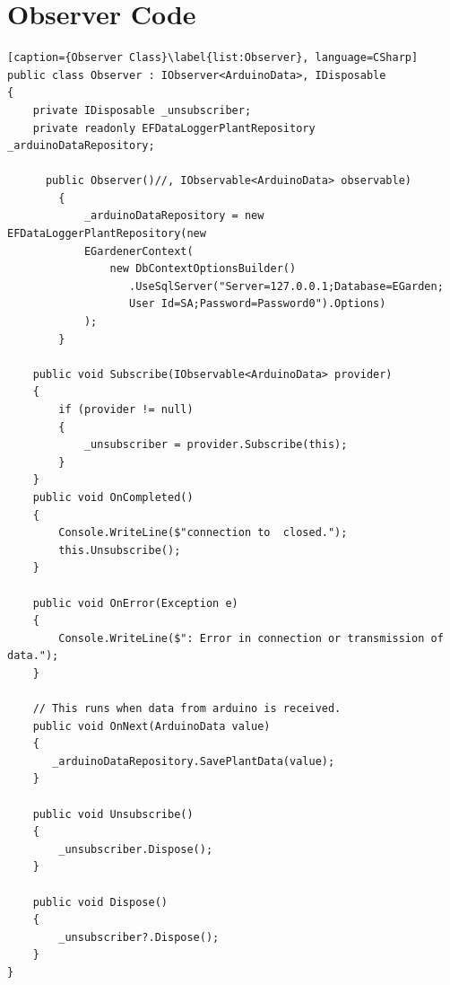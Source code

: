 \documentclass[a4paper,12pt,oneside,openright,titlepage]{book}
\begin{document}
\section{Observer Code}
\begin{lstlisting}[caption={Observer Class}\label{list:Observer}, language=CSharp]
public class Observer : IObserver<ArduinoData>, IDisposable
{
	private IDisposable _unsubscriber;
    private readonly EFDataLoggerPlantRepository _arduinoDataRepository;

	  public Observer()//, IObservable<ArduinoData> observable)
        {
            _arduinoDataRepository = new EFDataLoggerPlantRepository(new
            EGardenerContext(
                new DbContextOptionsBuilder()
                   .UseSqlServer("Server=127.0.0.1;Database=EGarden;
                   User Id=SA;Password=Password0").Options)
            );
        }

	public void Subscribe(IObservable<ArduinoData> provider)
    {
		if (provider != null)
		{	     
	        _unsubscriber = provider.Subscribe(this);
        }
	}
	public void OnCompleted()
    {
		Console.WriteLine($"connection to  closed.");
	    this.Unsubscribe();
    }

	public void OnError(Exception e)
	{
        Console.WriteLine($": Error in connection or transmission of data.");
	}

    // This runs when data from arduino is received.
	public void OnNext(ArduinoData value)
    {
       _arduinoDataRepository.SavePlantData(value);
    }

    public void Unsubscribe()
	{
        _unsubscriber.Dispose();
	}

	public void Dispose()
    {
		_unsubscriber?.Dispose();
	}
}
\end{lstlisting}
\end{document}
